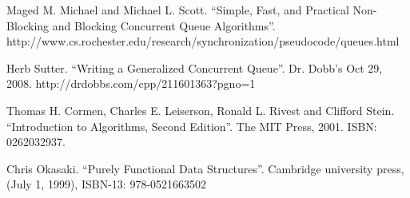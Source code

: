 \documentclass{article}
\begin{document}
\begin{thebibliography}{99}

Maged M. Michael and Michael L. Scott. ``Simple, Fast, and Practical Non-Blocking and Blocking Concurrent Queue Algorithms''. http://www.cs.rochester.edu/research/synchronization/pseudocode/queues.html

Herb Sutter. ``Writing a Generalized Concurrent Queue''. Dr. Dobb's Oct 29, 2008. http://drdobbs.com/cpp/211601363?pgno=1

Thomas H. Cormen, Charles E. Leiserson, Ronald L. Rivest and Clifford Stein. ``Introduction to Algorithms, Second Edition''. The MIT Press, 2001. ISBN: 0262032937.

Chris Okasaki. ``Purely Functional Data Structures''. Cambridge university press, (July 1, 1999), ISBN-13: 978-0521663502

\end{thebibliography}

\ifx\wholebook\relax \else
\end{document}
